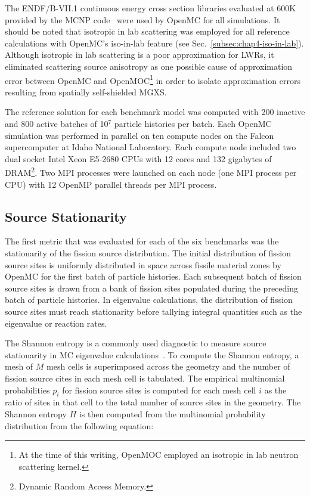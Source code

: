 The ENDF/B-VII.1 continuous energy cross section libraries evaluated at 600K provided by the MCNP code~\cite{mcnpx2003manual} were used by OpenMC for all simulations. It should be noted that isotropic in lab scattering was employed for all reference calculations with OpenMC's iso-in-lab feature (see Sec.~\ref{subsec:chap4-iso-in-lab}). Although isotropic in lab scattering is a poor approximation for \acp{LWR}, it eliminated scattering source anisotropy as one possible cause of approximation error between OpenMC and OpenMOC\footnote{At the time of this writing, OpenMOC employed an isotropic in lab neutron scattering kernel.} in order to isolate approximation errors resulting from spatially self-shielded \ac{MGXS}.

The reference solution for each benchmark model was computed with 200 inactive and 800 active batches of 10$^7$ particle histories per batch. Each OpenMC simulation was performed in parallel on ten compute nodes on the Falcon supercomputer at Idaho National Laboratory. Each compute node included two dual socket Intel Xeon E5-2680 CPUs with 12 cores and 132 gigabytes of DRAM\footnote{Dynamic Random Access Memory.}. Two MPI processes were launched on each node (one MPI process per CPU) with 12 OpenMP parallel threads per MPI process.

\subsection{Source Stationarity}
\label{subsec:chap7-src-stationarity}

The first metric that was evaluated for each of the six benchmarks was the stationarity of the fission source distribution. The initial distribution of fission source sites is uniformly distributed in space across fissile material zones by OpenMC for the first batch of particle histories. Each subsequent batch of fission source sites is drawn from a bank of fission sites populated during the preceding batch of particle histories. In eigenvalue calculations, the distribution of fission source sites must reach stationarity before tallying integral quantities such as the eigenvalue or reaction rates. 

The Shannon entropy is a commonly used diagnostic to measure source stationarity in \ac{MC} eigenvalue calculations~\cite{brown2006entropy}. To compute the Shannon entropy, a mesh of $M$ mesh cells is superimposed across the geometry and the number of fission source cites in each mesh cell is tabulated. The empirical multinomial probabilities $p_{i}$ for fission source sites is computed for each mesh cell $i$ as the ratio of sites in that cell to the total number of source sites in the geometry. The Shannon entropy $H$ is then computed from the multinomial probability distribution from the following equation:

